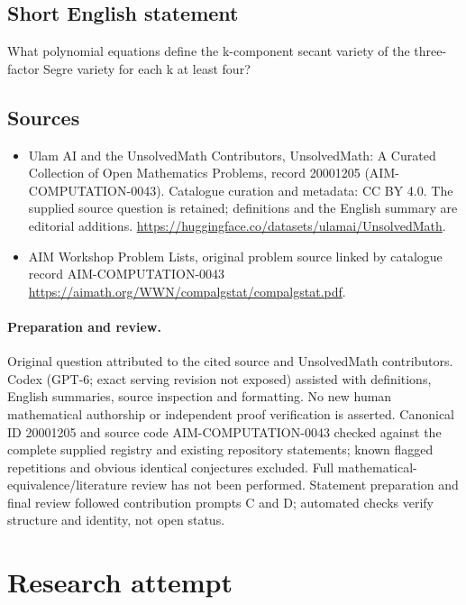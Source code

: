 \documentclass[11pt]{article}
\begin{document}
\subsection{Short English statement}
What polynomial equations define the k-component secant variety of the three-factor Segre variety for each k at least four?
\subsection{Sources}
\begin{itemize}
\item[S1] Ulam AI and the UnsolvedMath Contributors, UnsolvedMath: A Curated Collection of Open Mathematics Problems, record 20001205 (AIM-COMPUTATION-0043). Catalogue curation and metadata: CC BY 4.0. The supplied source question is retained; definitions and the English summary are editorial additions.
\url{https://huggingface.co/datasets/ulamai/UnsolvedMath}.
\item[S2] AIM Workshop Problem Lists, original problem source linked by catalogue record AIM-COMPUTATION-0043
\url{https://aimath.org/WWN/compalgstat/compalgstat.pdf}.
\end{itemize}
\paragraph{Preparation and review.}
Original question attributed to the cited source and UnsolvedMath contributors. Codex (GPT-6; exact serving revision not exposed) assisted with definitions, English summaries, source inspection and formatting. No new human mathematical authorship or independent proof verification is asserted. Canonical ID 20001205 and source code AIM-COMPUTATION-0043 checked against the complete supplied registry and existing repository statements; known flagged repetitions and obvious identical conjectures excluded. Full mathematical-equivalence/literature review has not been performed. Statement preparation and final review followed contribution prompts C and D; automated checks verify structure and identity, not open status.
\label{end:20001205}


\section{Research attempt}
\end{document}
